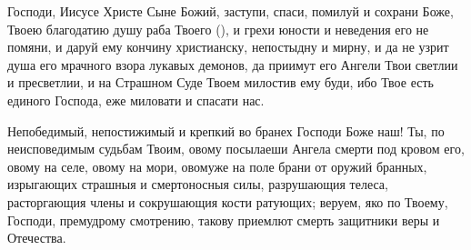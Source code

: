 \mychapterending

\begin{mymulticols}
 

Господи, Иисусе Христе Сыне Божий, заступи, спаси, помилуй и сохрани Боже, Твоею благодатию душу раба Твоего (), и грехи юности и неведения его не помяни, и даруй ему кончину христианску, непостыдну и мирну, и да не узрит душа его мрачного взора лукавых демонов, да приимут его Ангели Твои светлии и пресветлии, и на Страшном Суде Твоем милостив ему буди, ибо Твое есть единого Господа, еже миловати и спасати нас. 

\end{mymulticols}

\mychapterending

\begin{mymulticols}
 

Непобедимый, непостижимый и крепкий во бранех Господи Боже наш! Ты, по неисповедимым судьбам Твоим, овому посылаеши Ангела смерти под кровом его, овому на селе, овому на мори, овомуже на поле брани от оружий бранных, изрыгающих страшныя и смертоносныя силы, разрушающия телеса, расторгающия члены и сокрушающия кости ратующих; веруем, яко по Твоему, Господи, премудрому смотрению, такову приемлют смерть защитники веры и Отечества. 


\end{mymulticols}
